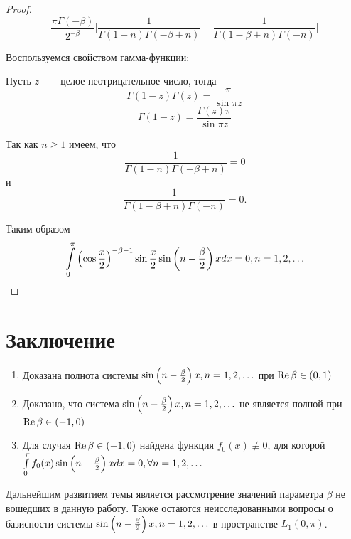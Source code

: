 \documentclass[oneside, final, 14pt]{extreport}
\begin{document}
\begin{proof}
		$$
			\frac{\pi\Gamma(-\beta)}{2^{-\beta}}\Bigg[\frac{1}{\Gamma(1 - n)\Gamma(-\beta + n)} - 
			\frac{1}{\Gamma(1 -\beta + n)\Gamma(- n)}\Bigg]
		$$
		
		Воспользуемся свойством гамма-функции: 
		
		Пусть $z$ ~--- целое неотрицательное число, тогда
		$$
			\Gamma(1 - z)\Gamma(z) = \frac{\pi}{\sin\pi z}
		$$
		$$
			\Gamma(1 - z) = \frac{\Gamma(z)\pi}{\sin\pi z} 
		$$
		
		\bigskip
		Так как $n \geq 1$ имеем, что 
		$$\frac{1}{\Gamma(1 - n)\Gamma(-\beta + n)} = 0$$ и
		$$\frac{1}{\Gamma(1 -\beta + n)\Gamma(- n)} = 0.$$ 
		
		Таким образом 
		$$
			\int\limits_0^\pi\left(\cos\frac{x}{2}\right)^{-\beta-1}\sin\frac{x}{2}\sin\left(n - \frac{\beta}{2}\right)xdx = 0, n = 1, 2, \ldots 
		$$
		
	\end{proof}




	
\chapter*{Заключение}
\begin{enumerate}
	\item Доказана полнота системы $\sin\left(n - \frac{\beta}{2}\right)x, n = 1, 2, \ldots$ при $\operatorname{Re}{\beta}\in(0, 1)$
	\item Доказано, что система $\sin\left(n - \frac{\beta}{2}\right)x, n = 1, 2, \ldots$ не является полной при $\operatorname{Re}{\beta}\in(-1, 0)$
	\item Для случая $\operatorname{Re}{\beta}\in(-1, 0)$ найдена функция $f_0(x) \not\equiv 0$, для которой \\
		$\int\limits_0^\pi f_0(x)\sin\left(n - \frac{\beta}{2}\right)xdx = 0, \forall n = 1, 2, \ldots$
\end{enumerate}

\bigskip
Дальнейшим развитием темы является рассмотрение значений параметра $\beta$ не вошедших в данную работу.
Также остаются неисследованными вопросы о базисности системы 
$\sin\left(n - \frac{\beta}{2}\right)x, n = 1, 2, \ldots$ в пространстве $L_1(0, \pi)$.
\end{document}
